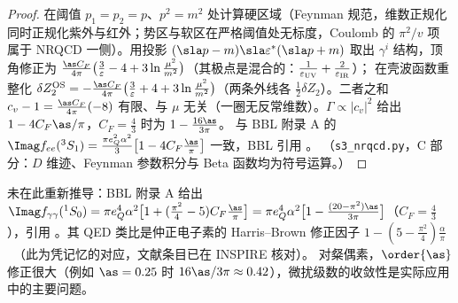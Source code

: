 \begin{proof}
在阈值 $p_1=p_2=p$、$p^2=m^2$ 处计算硬区域（Feynman 规范，维数正规化同时正规化紫外与红外；势区与软区在严格阈值处无标度，Coulomb 的 $\pi^2/v$ 项
属于 NRQCD 一侧）。用投影 $(\sla p-m)\sla\varepsilon^*(\sla p+m)$ 取出 $\gamma^i$ 结构，顶角修正为
$\frac{\as C_F}{4\pi}\big(\frac{3}{\varepsilon}-4+3\ln\frac{\mu^2}{m^2}\big)$（其极点是混合的：$\frac{1}{\varepsilon_{\rm UV}}+\frac{2}{\varepsilon_{\rm IR}}$）；
在壳波函数重整化 $\delta Z_2^{\rm OS}=-\frac{\as C_F}{4\pi}\big(\frac{3}{\varepsilon}+4+3\ln\frac{\mu^2}{m^2}\big)$（两条外线各 $\frac12\delta Z_2$）。二者之和
$c_v-1=\frac{\as C_F}{4\pi}(-8)$ 有限、与 $\mu$ 无关（一圈无反常维数）。$\Gamma\propto|c_v|^2$ 给出 $1-4C_F\as/\pi$，$C_F=\frac43$ 时为 $1-\frac{16\as}{3\pi}$。
与 BBL 附录 A 的 $\Imag f_{ee}(^3S_1)=\frac{\pi e_Q^2\alpha^2}{3}\big[1-4C_F\frac{\as}{\pi}\big]$ 一致，BBL 引用 \cite{BarbieriEtAl1975,Celmaster1979}。
（\texttt{s3\_\allowbreak nrqcd.py}，C 部分：$D$ 维迹、Feynman 参数积分与 Beta 函数均为符号运算。）
\end{proof}

\begin{remark}
未在此重新推导：BBL 附录 A 给出 $\Imag f_{\gamma\gamma}(^1S_0)=\pi e_Q^4\alpha^2\big[1+(\frac{\pi^2}{4}-5)C_F\frac{\as}{\pi}\big]
=\pi e_Q^4\alpha^2\big[1-\frac{(20-\pi^2)\as}{3\pi}\big]$（$C_F=\frac43$），引用 \cite{BarbieriEtAl1979}。其 QED 类比是仲正电子素的
Harris--Brown 修正因子 $1-(5-\frac{\pi^2}{4})\frac{\alpha}{\pi}$~\cite{HarrisBrown1957}（此为凭记忆的对应，文献条目已在 INSPIRE 核对）。
对粲偶素，$\order{\as}$ 修正很大（例如 $\as=0.25$ 时 $16\as/3\pi\approx0.42$），微扰级数的收敛性是实际应用中的主要问题。
\end{remark}

